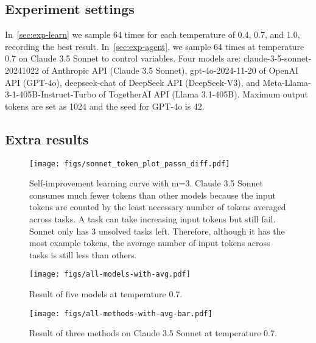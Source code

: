 \newpage

\subsection{Experiment settings}
\label{sec:exp-setting}
In~\cref{sec:exp-learn} we sample 64 times for each temperature of 0.4, 0.7, and 1.0, recording the best result. In~\cref{sec:exp-agent}, we sample 64 times at temperature 0.7 on Claude 3.5 Sonnet to control variables. Four models are: claude-3-5-sonnet-20241022 of Anthropic API (Claude 3.5 Sonnet), gpt-4o-2024-11-20 of OpenAI API (GPT-4o), deepseek-chat of DeepSeek API (DeepSeek-V3), and Meta-Llama-3-1-405B-Instruct-Turbo of TogetherAI API (Llama 3.1-405B). Maximum output tokens are set as 1024 and the seed for GPT-4o is 42.

\subsection{Extra results}
\begin{figure}[htb]
    \centering
    \texttt{[image: figs/sonnet\_token\_plot\_passn\_diff.pdf]}
    \caption{Self-improvement learning curve with m=3. Claude 3.5 Sonnet consumes much fewer tokens than other models because the input tokens are counted by the least necessary number of tokens averaged across tasks. A task can take increasing input tokens but still fail. Sonnet only has 3 unsolved tasks left. Therefore, although it has the most example tokens, the average number of input tokens across tasks is still less than others.}
    \label{fig:sonnet-learning-curve}
\end{figure}

 
\begin{figure}[htb]
\begin{center}
\centerline{\texttt{[image: figs/all-models-with-avg.pdf]}}
\caption{Result of five models at temperature 0.7.}
\label{fig:all-models}
\end{center}
\end{figure}

\begin{figure}[htb]
\begin{center}
\centerline{\texttt{[image: figs/all-methods-with-avg-bar.pdf]}}
\caption{Result of three methods on Claude 3.5 Sonnet at temperature 0.7.}
\label{fig:all-methods-sonnet}
\end{center}
\end{figure}

